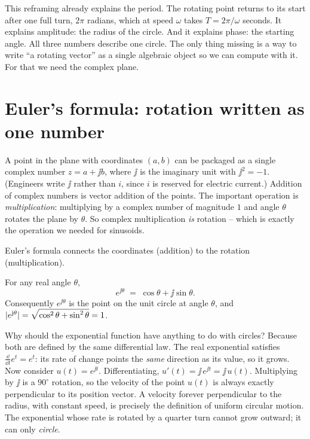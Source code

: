 This reframing already explains the period. The rotating point returns to its start after one full
turn, $2\pi$ radians, which at speed $\omega$ takes $T = 2\pi/\omega$ seconds. It explains
amplitude: the radius of the circle. And it explains phase: the starting angle. All three numbers
describe one circle. The only thing missing is a way to write ``a rotating vector'' as a
single algebraic object so we can compute with it. For that we need the complex plane.

\section{Euler's formula: rotation written as one number}
\label{ch04:euler}

A point in the plane with coordinates $(a, b)$ can be packaged as a single complex number
$z = a + \jj b$, where $\jj$ is the imaginary unit with $\jj^2 = -1$. (Engineers write $\jj$ rather
than $i$, since $i$ is reserved for electric current.) Addition of complex numbers is vector
addition of the points. The important operation is \emph{multiplication}: multiplying by a complex
number of magnitude $1$ and angle $\theta$ rotates the plane by $\theta$. So complex multiplication
\emph{is} rotation -- which is exactly the operation we needed for sinusoids.

Euler's formula connects the coordinates (addition) to the rotation (multiplication).

\begin{theorem}
\label{ch04:thm-euler}
For any real angle $\theta$,
\[
  e^{\jj\theta} \;=\; \cos\theta + \jj\sin\theta .
\]
Consequently $e^{\jj\theta}$ is the point on the unit circle at angle $\theta$, and
$\lvert e^{\mathrm{j}\theta}\rvert = \sqrt{\cos^2\theta + \sin^2\theta} = 1$.
\end{theorem}

\begin{whybox}
Why should the exponential function have anything to do
with circles? Because both are defined by the same differential law.
The real exponential satisfies $\frac{\dd}{\dd t}e^{t} = e^{t}$: its rate of change points the
\emph{same} direction as its value, so it grows. Now consider $u(t) = e^{\jj t}$. Differentiating,
$u'(t) = \jj\, e^{\jj t} = \jj\, u(t)$. Multiplying by $\jj$ is a $90^\circ$ rotation, so the
velocity of the point $u(t)$ is always exactly perpendicular to its position vector. A velocity
forever perpendicular to the radius, with constant speed, is precisely the definition of uniform
circular motion. The exponential whose rate is rotated by a quarter turn cannot grow outward; it
can only \emph{circle}.
\end{whybox}

